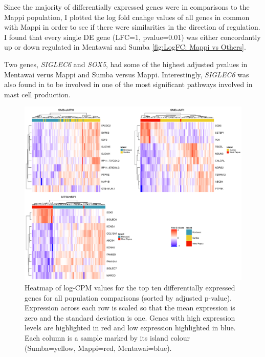 \documentclass[12pt,a4paper,titlepage,twoside,openright]{book}
\begin{document}
\begin{mainmatter}
{Since the majority of differentially expressed genes were in comparisons to the Mappi population, I plotted the log fold cnahge values of all genes in common with Mappi in order to see if there were similarities in the direction of regulation. I found that every single DE gene (LFC=1, pvalue=0.01) was either concordantly up or down regulated in Mentawai and Sumba \ref{fig:LogFC: Mappi vs Others}.

Two genes, \textit{SIGLEC6} and \textit{SOX5}, had some of the highest adjusted pvalues in Mentawai verus Mappi and Sumba versus Mappi. Interestingly, \textit{SIGLEC6} was also found in to be involved in one of the most significant pathways involved in mast cell production. 


\begin{figure}[htb!]
\centering
\includegraphics[width=\textwidth,height=\textheight,keepaspectratio]{Figures/HeatmapAllPops_dupCor.pdf}
\caption{Heatmap of log-CPM values for the top ten differentially expressed genes for all population comparisons (sorted by adjusted p-value). Expression across each row is scaled so that the mean expression is zero and the standard deviation is one. Genes with high expression levels are highlighted in red and low expression highlighted in blue. Each column is a sample marked by its island colour (Sumba=yellow, Mappi=red, Mentawai=blue).}
\label{fig:Heatmap Top Genes}
\end{figure}

}
\end{mainmatter}
\end{document}
